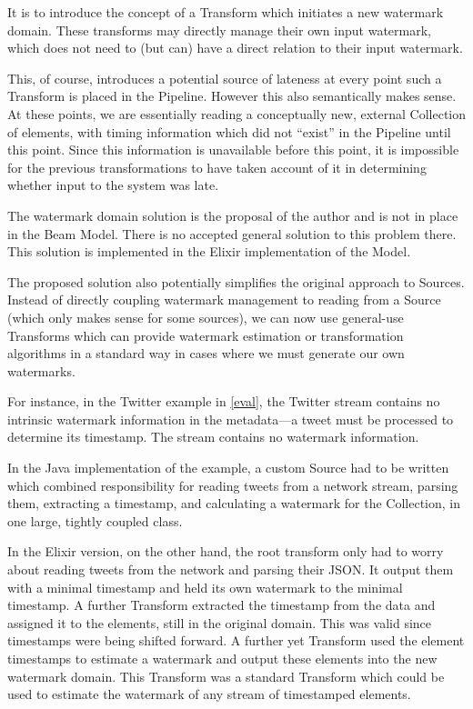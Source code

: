 It is to introduce the concept of a Transform which initiates a new watermark domain.
These transforms may directly manage their own input watermark, which does not need to (but can) have a direct relation to their input watermark.

This, of course, introduces a potential source of lateness at every point such a Transform is placed in the Pipeline.
However this also semantically makes sense.
At these points, we are essentially reading a conceptually new, external Collection of elements, with timing information which did not ``exist'' in the Pipeline until this point.
Since this information is unavailable before this point, it is impossible for the previous transformations to have taken account of it in determining whether input to the system was late.

The watermark domain solution is the proposal of the author and is not in place in the Beam Model.
There is no accepted general solution to this problem there.
This solution is implemented in the Elixir implementation of the Model.

The proposed solution also potentially simplifies the original approach to Sources.
Instead of directly coupling watermark management to reading from a Source (which only makes sense for some sources), we can now use general-use Transforms which can provide watermark estimation or transformation algorithms in a standard way in cases where we must generate our own watermarks.

For instance, in the Twitter example in \cref{eval}, the Twitter stream contains no intrinsic watermark information in the metadata---a tweet must be processed to determine its timestamp.
The stream contains no watermark information.

In the Java implementation of the example, a custom Source had to be written which combined responsibility for reading tweets from a network stream, parsing them, extracting a timestamp, and calculating a watermark for the Collection, in one large, tightly coupled class.

In the Elixir version, on the other hand, the root transform only had to worry about reading tweets from the network and parsing their JSON.
It output them with a minimal timestamp and held its own watermark to the minimal timestamp.
A further Transform extracted the timestamp from the data and assigned it to the elements, still in the original domain.
This was valid since timestamps were being shifted forward.
A further yet Transform used the element timestamps to estimate a watermark and output these elements into the new watermark domain.
This Transform was a standard Transform which could be used to estimate the watermark of any stream of timestamped elements.

